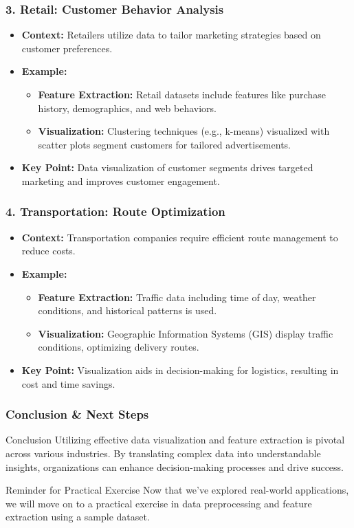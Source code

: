 \documentclass[aspectratio=169]{beamer}
\begin{document}
\begin{frame}[fragile]
    \frametitle{3. Retail: Customer Behavior Analysis}
    \begin{itemize}
        \item \textbf{Context:} Retailers utilize data to tailor marketing strategies based on customer preferences.
        \item \textbf{Example:}
        \begin{itemize}
            \item \textbf{Feature Extraction:} Retail datasets include features like purchase history, demographics, and web behaviors.
            \item \textbf{Visualization:} Clustering techniques (e.g., k-means) visualized with scatter plots segment customers for tailored advertisements.
        \end{itemize}
        \item \textbf{Key Point:} Data visualization of customer segments drives targeted marketing and improves customer engagement.
    \end{itemize}
\end{frame}

\begin{frame}[fragile]
    \frametitle{4. Transportation: Route Optimization}
    \begin{itemize}
        \item \textbf{Context:} Transportation companies require efficient route management to reduce costs.
        \item \textbf{Example:}
        \begin{itemize}
            \item \textbf{Feature Extraction:} Traffic data including time of day, weather conditions, and historical patterns is used.
            \item \textbf{Visualization:} Geographic Information Systems (GIS) display traffic conditions, optimizing delivery routes.
        \end{itemize}
        \item \textbf{Key Point:} Visualization aids in decision-making for logistics, resulting in cost and time savings.
    \end{itemize}
\end{frame}

\begin{frame}[fragile]
    \frametitle{Conclusion \& Next Steps}
    \begin{block}{Conclusion}
        Utilizing effective data visualization and feature extraction is pivotal across various industries. By translating complex data into understandable insights, organizations can enhance decision-making processes and drive success.
    \end{block}
    \begin{block}{Reminder for Practical Exercise}
        Now that we've explored real-world applications, we will move on to a practical exercise in data preprocessing and feature extraction using a sample dataset.
    \end{block}
\end{frame}
\end{document}
